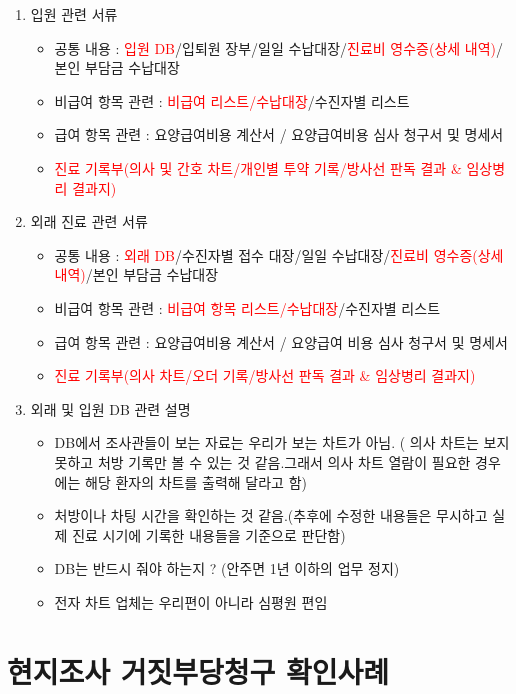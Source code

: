 \begin{enumerate}[①]
\begin{itemize}
	\end{itemize}	
\item 입원 관련 서류
	\begin{itemize}\tightlist
	\item 공통 내용 : \textcolor{red}{입원 DB}/입퇴원 장부/일일 수납대장/\textcolor{red}{진료비 영수증(상세 내역)}/본인 부담금 수납대장 
	\item 비급여 항목 관련 : \textcolor{red}{비급여 리스트/수납대장}/수진자별 리스트
	\item 급여 항목 관련 : 요양급여비용 계산서 / 요양급여비용 심사 청구서 및 명세서
	\item \textcolor{red}{진료 기록부(의사 및 간호 차트/개인별 투약 기록/방사선 판독 결과 \& 임상병리 결과지)}
	\end{itemize}	
\item 외래 진료 관련 서류
	\begin{itemize}\tightlist
	\item 공통 내용 : \textcolor{red}{외래 DB}/수진자별 접수 대장/일일 수납대장/\textcolor{red}{진료비 영수증(상세 내역)}/본인 부담금 수납대장 
	\item 비급여 항목 관련 : \textcolor{red}{비급여 항목 리스트/수납대장}/수진자별 리스트
	\item 급여 항목 관련 : 요양급여비용 계산서 / 요양급여 비용 심사 청구서 및 명세서 
	\item \textcolor{red}{진료 기록부(의사 차트/오더 기록/방사선 판독 결과 \& 임상병리 결과지)}
	\end{itemize}	
\item 외래 및 입원 DB 관련 설명
	\begin{itemize}\tightlist
	\item DB에서 조사관들이 보는 자료는 우리가 보는 차트가 아님.
 ( 의사 차트는 보지 못하고 처방 기록만 볼 수 있는 것 같음.그래서 의사 차트 열람이 필요한 경우에는 해당 환자의 차트를 출력해 달라고 함)
	\item 처방이나 차팅 시간을 확인하는 것 같음.(추후에 수정한 내용들은 무시하고 실제 진료 시기에 기록한 내용들을 기준으로 판단함)
	\item DB는 반드시 줘야 하는지 ? (안주면 1년 이하의 업무 정지)
	\item 전자 차트 업체는 우리편이 아니라 심평원 편임
	\end{itemize}	
\end{enumerate}

\clearpage
\section{현지조사 거짓\cntrdot{}부당청구 확인사례}
